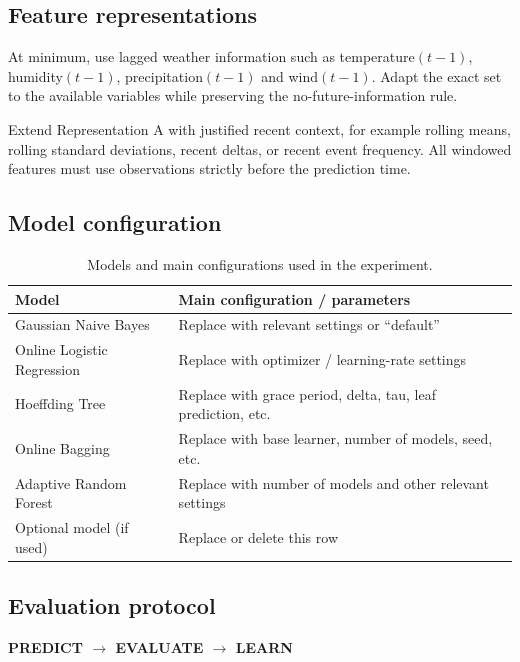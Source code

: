 \documentclass[11pt,a4paper]{article}
\begin{document}
\subsection{Feature representations}
\begin{businessbox}[title=Representation A - Previous-state features]
At minimum, use lagged weather information such as temperature$(t-1)$, humidity$(t-1)$, precipitation$(t-1)$ and wind$(t-1)$. Adapt the exact set to the available variables while preserving the no-future-information rule.
\end{businessbox}

\begin{businessbox}[title=Representation B - Temporal stream context]
Extend Representation A with justified recent context, for example rolling means, rolling standard deviations, recent deltas, or recent event frequency. All windowed features must use observations strictly before the prediction time.
\end{businessbox}

\subsection{Model configuration}
\begin{table}[H]
\centering
\caption{Models and main configurations used in the experiment.}
\label{tab:model-config}
\begin{tabularx}{0.96\textwidth}{@{}L{4.7cm}Y@{}}
\toprule
\textbf{Model} & \textbf{Main configuration / parameters} \\
\midrule
Gaussian Naive Bayes & Replace with relevant settings or ``default'' \\
Online Logistic Regression & Replace with optimizer / learning-rate settings \\
Hoeffding Tree & Replace with grace period, delta, tau, leaf prediction, etc. \\
Online Bagging & Replace with base learner, number of models, seed, etc. \\
Adaptive Random Forest & Replace with number of models and other relevant settings \\
Optional model (if used) & Replace or delete this row \\
\bottomrule
\end{tabularx}
\end{table}

\subsection{Evaluation protocol}
\begin{keybox}[title=Mandatory streaming order]
\centering\Large\textbf{PREDICT $\rightarrow$ EVALUATE $\rightarrow$ LEARN}
\end{keybox}
\end{document}
